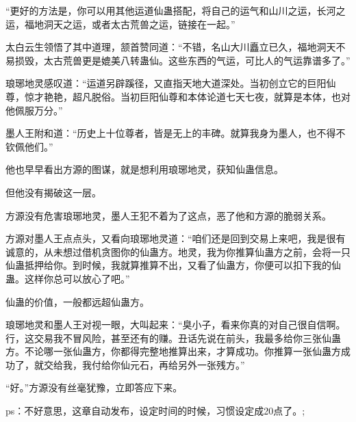 \begin{this_body}
“更好的方法是，你可以用其他运道仙蛊搭配，将自己的运气和山川之运，长河之运，福地洞天之运，或者太古荒兽之运，链接在一起。”

太白云生领悟了其中道理，颔首赞同道：“不错，名山大川矗立已久，福地洞天不易损毁，太古荒兽更是媲美八转蛊仙。这些东西的气运，可比人的气运靠谱多了。”

琅琊地灵感叹道：“运道另辟蹊径，又直指天地大道深处。当初创立它的巨阳仙尊，惊才艳艳，超凡脱俗。当初巨阳仙尊和本体论道七天七夜，就算是本体，也对他佩服万分。”

墨人王附和道：“历史上十位尊者，皆是无上的丰碑。就算我身为墨人，也不得不钦佩他们。”

他也早早看出方源的图谋，就是想利用琅琊地灵，获知仙蛊信息。

但他没有揭破这一层。

方源没有危害琅琊地灵，墨人王犯不着为了这点，恶了他和方源的脆弱关系。

方源对墨人王点点头，又看向琅琊地灵道：“咱们还是回到交易上来吧，我是很有诚意的，从未想过借机贪图你的仙蛊方。地灵，我为你推算仙蛊方之前，会将一只仙蛊抵押给你。到时候，我就算推算不出，又看了仙蛊方，你便可以扣下我的仙蛊。这样你总可以放心了吧。”

仙蛊的价值，一般都远超仙蛊方。

琅琊地灵和墨人王对视一眼，大叫起来：“臭小子，看来你真的对自己很自信啊。行，这交易我不冒风险，甚至还有的赚。丑话先说在前头，我最多给你三张仙蛊方。不论哪一张仙蛊方，你都得完整地推算出来，才算成功。你推算一张仙蛊方成功了，就交给我，我付给你仙元石，再给另外一张残方。”

“好。”方源没有丝毫犹豫，立即答应下来。

ps：不好意思，这章自动发布，设定时间的时候，习惯设定成20点了。;

\end{this_body}

